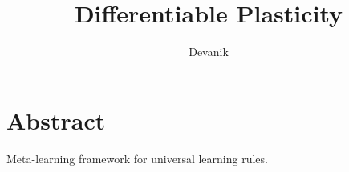 \documentclass{article}
\title{Differentiable Plasticity}
\author{Devanik}
\begin{document}
\maketitle
\section{Abstract}
Meta-learning framework for universal learning rules.
\end{document}
